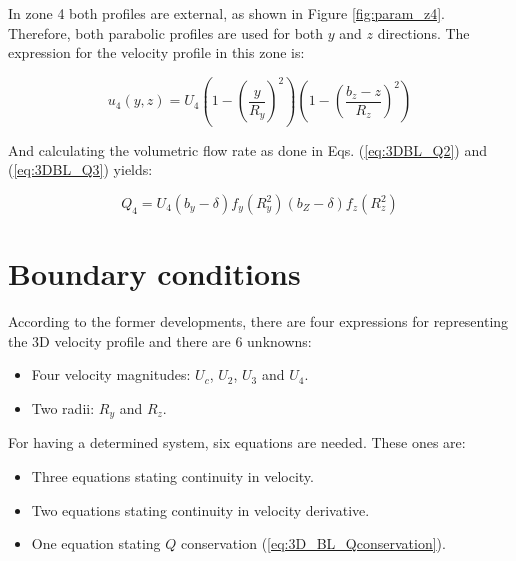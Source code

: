 In zone 4 both profiles are external, as shown in Figure \ref{fig:param_z4}. Therefore, both parabolic profiles are used for both $y$ and $z$ directions. The expression for the velocity profile in this zone is:

\begin{equation}
\label{eq:3DBL_profile_u4}
\boxed{
u_4 \left( y, z \right) = U_4 \left( 1 - \left( \frac{y}{R_y} \right)^2 \right) \left( 1 - \left( \frac{b_z - z}{R_z} \right)^2 \right) 
}
\end{equation}

And calculating the volumetric flow rate as done in Eqs. (\ref{eq:3DBL_Q2}) and (\ref{eq:3DBL_Q3}) yields:

\begin{equation}
\label{eq:3DBL_Q4}
\boxed{
Q_4 = U_4 \left( b_y - \delta \right) f_y \left( R_y^2 \right) \left( b_Z - \delta \right) f_z \left( R_z^2 \right)
}
\end{equation}

\section{Boundary conditions}

According to the former developments, there are four expressions for representing the 3D velocity profile and there are 6 unknowns: 

\begin{itemize}

	\item Four velocity magnitudes: $U_c$, $U_2$, $U_3$ and $U_4$.

	\item Two radii: $R_y$ and $R_z$.

\end{itemize}

For having a determined system, six equations are needed. These ones are:

\begin{itemize}

	\item Three equations stating continuity in velocity.

	\item Two equations stating continuity in velocity derivative.
	
	\item One equation stating $Q$ conservation (\ref{eq:3D_BL_Qconservation}).

\end{itemize}

